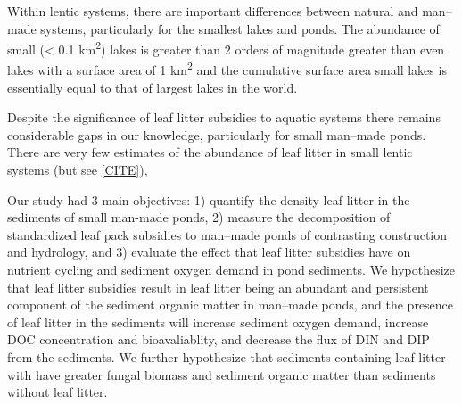 Within lentic systems, there are important differences between natural and man--made systems, particularly for the smallest lakes and ponds. The abundance of small (< 0.1 km\textsuperscript{2}) lakes is greater than 2 orders of magnitude greater than even lakes with a surface area of 1 km\textsuperscript{2} \cite{Downing_2010} and the cumulative surface area small lakes is essentially equal to that of largest lakes in the world.  

Despite the significance of leaf litter subsidies to aquatic systems there remains considerable gaps in our knowledge, particularly for small man--made ponds.  There are very few estimates of the abundance of leaf litter in small lentic systems (but see \ref{CITE}),  

Our study had 3 main objectives: 1) quantify the density leaf litter in the sediments of small man-made ponds, 2) measure the decomposition of standardized leaf pack subsidies to man--made ponds of contrasting construction and hydrology, and 3) evaluate the effect that leaf litter subsidies have on nutrient cycling and sediment oxygen demand in pond sediments. We hypothesize that leaf litter subsidies result in leaf litter being an abundant and persistent component of the sediment organic matter in man--made ponds, and the presence of leaf litter in the sediments will increase sediment oxygen demand, increase DOC concentration and bioavaliablity, and decrease the flux of DIN and DIP from the sediments. We further hypothesize that sediments containing leaf litter with have greater fungal biomass and sediment organic matter than sediments without leaf litter.